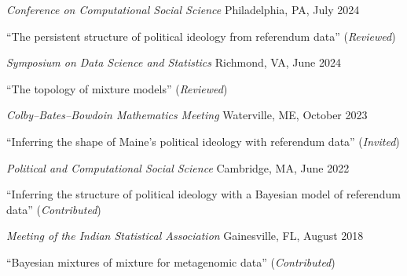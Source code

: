 \documentclass[10pt]{article}
\newenvironment{outerlist}[1][\enskip\textbullet]%
        {\begin{itemize}[#1]}{\end{itemize}%
         \vspace{-.6\baselineskip}}
\newenvironment{innerlist}[1][\enskip\textbullet]%
        {\begin{compactitem}[#1]}{\end{compactitem}}
\begin{document}
\begin{outerlist}
\item[] \textit{Conference on Computational Social Science}%
        \hfill {Philadelphia, PA, July 2024}
\begin{innerlist}
\item ``The persistent structure of political ideology from referendum data''  (\emph{Reviewed})
\end{innerlist}
\end{outerlist} 

\begin{outerlist}
\item[] \textit{Symposium on Data Science and Statistics}%
	\hfill{Richmond, VA, June 2024}
\begin{innerlist}
\item ``The topology of mixture models''  (\emph{Reviewed})
\end{innerlist}
\end{outerlist} 


\begin{outerlist}
\item[] \textit{Colby--Bates--Bowdoin Mathematics Meeting}%
        \hfill {Waterville, ME, October 2023}
\begin{innerlist}
\item ``Inferring the shape of Maine's political ideology with referendum data''  (\emph{Invited})
\end{innerlist}
\end{outerlist} 



\begin{outerlist}
\item[] \textit{Political and Computational Social Science}%
        \hfill {Cambridge, MA, June 2022}
\begin{innerlist}
\item ``Inferring the structure of political ideology with a Bayesian model of referendum data''  (\emph{Contributed})
\end{innerlist}
\end{outerlist} 

\begin{outerlist}
\item[] \textit{Meeting of the Indian Statistical Association}%
        \hfill {Gainesville, FL, August 2018}
\begin{innerlist}
\item ``Bayesian mixtures of mixture for metagenomic data''  (\emph{Contributed})
\end{innerlist}
\end{outerlist} 
\end{document}
